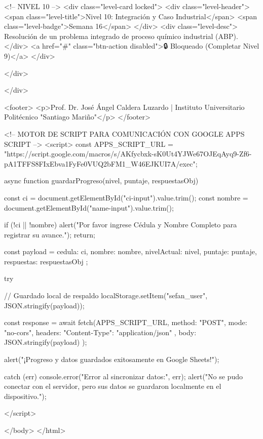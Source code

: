            <!-- NIVEL 10 -->
            <div class="level-card locked">
                <div class="level-header">
                    <span class="level-title">Nivel 10: Integración y Caso Industrial</span>
                    <span class="level-badge">Semana 16</span>
                </div>
                <div class="level-desc">
                    Resolución de un problema integrado de proceso químico industrial (ABP).
                </div>
                <a href="#" class="btn-action disabled">🔒 Bloqueado (Completar Nivel 9)</a>
            </div>

        </div>

    </div>

    <footer>
        <p>Prof. Dr. José Ángel Caldera Luzardo | Instituto Universitario Politécnico "Santiago Mariño"</p>
    </footer>

    <!-- MOTOR DE SCRIPT PARA COMUNICACIÓN CON GOOGLE APPS SCRIPT -->
    <script>
        const APPS_SCRIPT_URL = "https://script.google.com/macros/s/AKfycbxk-sK0Ut4YJWe67OJEqAyq9-Zf6-pA1TFFS8FIxEbva1FyFe0VUQ2bFM1_W46EJKUI7A/exec";

        async function guardarProgreso(nivel, puntaje, respuestasObj) {
            const ci = document.getElementById("ci-input").value.trim();
            const nombre = document.getElementById("name-input").value.trim();

            if (!ci || !nombre) {
                alert("Por favor ingrese Cédula y Nombre Completo para registrar su avance.");
                return;
            }

            const payload = {
                cedula: ci,
                nombre: nombre,
                nivelActual: nivel,
                puntaje: puntaje,
                respuestas: respuestasObj
            };

            try {
                // Guardado local de respaldo
                localStorage.setItem("sefan_user", JSON.stringify(payload));

                const response = await fetch(APPS_SCRIPT_URL, {
                    method: "POST",
                    mode: "no-cors",
                    headers: {
                        "Content-Type": "application/json"
                    },
                    body: JSON.stringify(payload)
                });

                alert("¡Progreso y datos guardados exitosamente en Google Sheets!");
            } catch (err) {
                console.error("Error al sincronizar datos:", err);
                alert("No se pudo conectar con el servidor, pero sus datos se guardaron localmente en el dispositivo.");
            }
        }
    </script>

</body>
</html>
